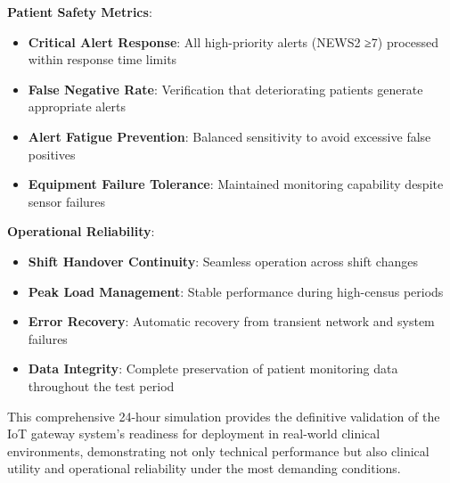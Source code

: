 \textbf{Patient Safety Metrics}:
\begin{itemize}
    \item \textbf{Critical Alert Response}: All high-priority alerts (NEWS2 ≥7) processed within response time limits
    \item \textbf{False Negative Rate}: Verification that deteriorating patients generate appropriate alerts
    \item \textbf{Alert Fatigue Prevention}: Balanced sensitivity to avoid excessive false positives
    \item \textbf{Equipment Failure Tolerance}: Maintained monitoring capability despite sensor failures
\end{itemize}

\textbf{Operational Reliability}:
\begin{itemize}
    \item \textbf{Shift Handover Continuity}: Seamless operation across shift changes
    \item \textbf{Peak Load Management}: Stable performance during high-census periods
    \item \textbf{Error Recovery}: Automatic recovery from transient network and system failures
    \item \textbf{Data Integrity}: Complete preservation of patient monitoring data throughout the test period
\end{itemize}

This comprehensive 24-hour simulation provides the definitive validation of the IoT gateway system's readiness for deployment in real-world clinical environments, demonstrating not only technical performance but also clinical utility and operational reliability under the most demanding conditions.
